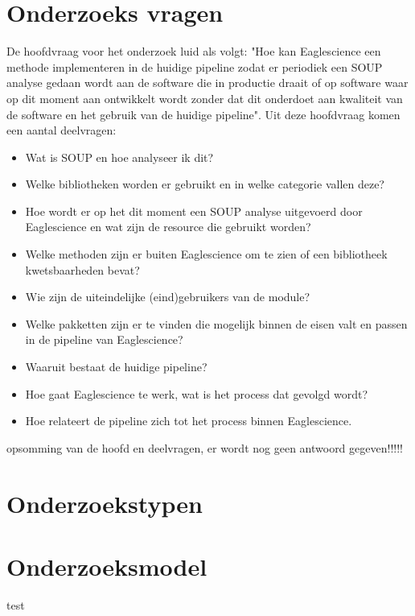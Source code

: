\section{Onderzoeks vragen}
De hoofdvraag voor het onderzoek luid als volgt: "Hoe kan Eaglescience een methode implementeren in de huidige pipeline zodat er periodiek een SOUP analyse gedaan wordt aan de software die in productie draait of op software waar op dit moment aan ontwikkelt wordt zonder dat dit onderdoet aan kwaliteit van de software en het gebruik van de huidige pipeline". Uit deze hoofdvraag komen een aantal deelvragen:
\begin{itemize}
\item Wat is SOUP en hoe analyseer ik dit? 
\item Welke bibliotheken worden er gebruikt en in welke categorie vallen deze? 
\item Hoe wordt er op het dit moment een SOUP analyse uitgevoerd door Eaglescience en wat zijn de resource die gebruikt worden?
\item Welke methoden zijn er buiten Eaglescience om te zien of een bibliotheek kwetsbaarheden bevat?
\item Wie zijn de uiteindelijke (eind)gebruikers van de module?

\item Welke pakketten zijn er te vinden die mogelijk binnen de eisen valt en passen in de pipeline van Eaglescience?
\item Waaruit bestaat de huidige pipeline?
\item Hoe gaat Eaglescience te werk, wat is het process dat gevolgd wordt?
\item Hoe relateert de pipeline zich tot het process binnen Eaglescience.
\end{itemize}

opsomming van de hoofd en deelvragen, er wordt nog geen antwoord gegeven!!!!!
\section{Onderzoekstypen}
\section{Onderzoeksmodel}
test



